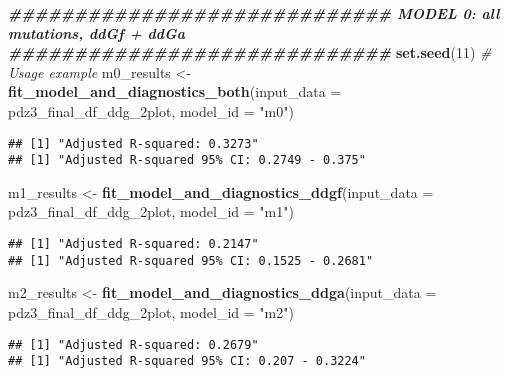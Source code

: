 \documentclass[
]{article}
\newenvironment{Shaded}{\begin{snugshade}}{\end{snugshade}}
\newcommand{\AttributeTok}[1]{\textcolor[rgb]{0.13,0.29,0.53}{#1}}
\newcommand{\CommentTok}[1]{\textcolor[rgb]{0.56,0.35,0.01}{\textit{#1}}}
\newcommand{\DecValTok}[1]{\textcolor[rgb]{0.00,0.00,0.81}{#1}}
\newcommand{\DocumentationTok}[1]{\textcolor[rgb]{0.56,0.35,0.01}{\textbf{\textit{#1}}}}
\newcommand{\FunctionTok}[1]{\textcolor[rgb]{0.13,0.29,0.53}{\textbf{#1}}}
\newcommand{\NormalTok}[1]{#1}
\newcommand{\OtherTok}[1]{\textcolor[rgb]{0.56,0.35,0.01}{#1}}
\newcommand{\StringTok}[1]{\textcolor[rgb]{0.31,0.60,0.02}{#1}}
\begin{document}
\begin{Shaded}
\begin{Highlighting}[]
\DocumentationTok{\#\#\#\#\#\#\#\#\#\#\#\#\#\#\#\#\#\#\#\#\#\#\#\#\#\#\#\#\# MODEL 0: all mutations, ddGf + ddGa \#\#\#\#\#\#\#\#\#\#\#\#\#\#\#\#\#\#\#\#\#\#\#\#\#\#\#\#\#}
\FunctionTok{set.seed}\NormalTok{(}\DecValTok{11}\NormalTok{)}
\CommentTok{\# Usage example}
\NormalTok{m0\_results }\OtherTok{\textless{}{-}} \FunctionTok{fit\_model\_and\_diagnostics\_both}\NormalTok{(}\AttributeTok{input\_data =}\NormalTok{ pdz3\_final\_df\_ddg\_2plot, }\AttributeTok{model\_id =} \StringTok{"m0"}\NormalTok{)}
\end{Highlighting}
\end{Shaded}

\begin{verbatim}
## [1] "Adjusted R-squared: 0.3273"
## [1] "Adjusted R-squared 95% CI: 0.2749 - 0.375"
\end{verbatim}

\begin{Shaded}
\begin{Highlighting}[]
\NormalTok{m1\_results }\OtherTok{\textless{}{-}} \FunctionTok{fit\_model\_and\_diagnostics\_ddgf}\NormalTok{(}\AttributeTok{input\_data =}\NormalTok{ pdz3\_final\_df\_ddg\_2plot, }\AttributeTok{model\_id =} \StringTok{"m1"}\NormalTok{)}
\end{Highlighting}
\end{Shaded}

\begin{verbatim}
## [1] "Adjusted R-squared: 0.2147"
## [1] "Adjusted R-squared 95% CI: 0.1525 - 0.2681"
\end{verbatim}

\begin{Shaded}
\begin{Highlighting}[]
\NormalTok{m2\_results }\OtherTok{\textless{}{-}} \FunctionTok{fit\_model\_and\_diagnostics\_ddga}\NormalTok{(}\AttributeTok{input\_data =}\NormalTok{ pdz3\_final\_df\_ddg\_2plot, }\AttributeTok{model\_id =} \StringTok{"m2"}\NormalTok{)}
\end{Highlighting}
\end{Shaded}

\begin{verbatim}
## [1] "Adjusted R-squared: 0.2679"
## [1] "Adjusted R-squared 95% CI: 0.207 - 0.3224"
\end{verbatim}
\end{document}
